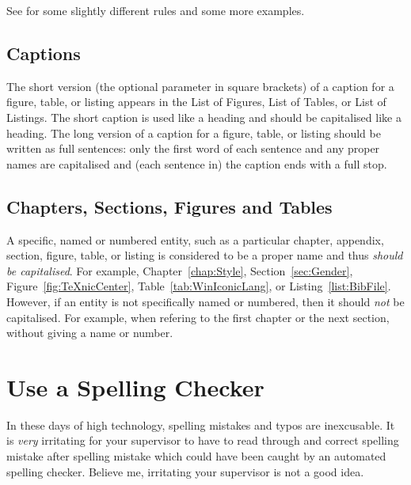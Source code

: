 See \textcite{WB-Capitalisation} for some slightly different rules and
some more examples.






\subsection{Captions}

The short version (the optional parameter in square brackets) of a
caption for a figure, table, or listing appears in the List of
Figures, List of Tables, or List of Listings. The short caption is
used like a heading and should be capitalised like a heading. The long
version of a caption for a figure, table, or listing should be written
as full sentences: only the first word of each sentence and any proper
names are capitalised and (each sentence in) the caption ends with a
full stop.




\subsection{Chapters, Sections, Figures and Tables}

A specific, named or numbered entity, such as a particular chapter,
appendix, section, figure, table, or listing is considered to be a
proper name and thus \emph{should be capitalised}. For example,
Chapter~\ref{chap:Style}, Section~\ref{sec:Gender},
Figure~\ref{fig:TeXnicCenter}, Table~\ref{tab:WinIconicLang}, or
Listing~\ref{list:BibFile}. However, if an entity is not specifically
named or numbered, then it should \emph{not} be capitalised. For
example, when refering to the first chapter or the next section,
without giving a name or number.








\section{Use a Spelling Checker}

In these days of high technology, spelling mistakes and typos are
inexcusable. It is \emph{very} irritating for your supervisor to have
to read through and correct spelling mistake after spelling mistake
which could have been caught by an automated spelling checker.
Believe me, irritating your supervisor is not a good idea.

